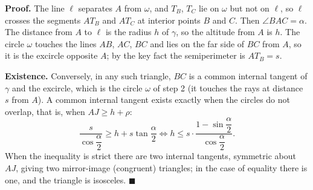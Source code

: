 \textbf{Proof.} The line $\ell$ separates $A$ from $\omega$, and $T_B$, $T_C$ lie on $\omega$ but not on $\ell$, so $\ell$ crosses the segments $AT_B$ and $AT_C$ at interior points $B$ and $C$. Then $\angle BAC=\alpha$. The distance from $A$ to $\ell$ is the radius $h$ of $\gamma$, so the altitude from $A$ is $h$. The circle $\omega$ touches the lines $AB$, $AC$, $BC$ and lies on the far side of $BC$ from $A$, so it is the excircle opposite $A$; by the key fact the semiperimeter is $AT_B=s$.

\textbf{Existence.} Conversely, in any such triangle, $BC$ is a common internal tangent of $\gamma$ and the excircle, which is the circle $\omega$ of step 2 (it touches the rays at distance $s$ from $A$). A common internal tangent exists exactly when the circles do not overlap, that is, when $AJ\ge h+\rho$:
\[\dfrac{s}{\cos\dfrac\alpha2}\ge h+s\tan\dfrac\alpha2\iff h\le s\cdot\dfrac{1-\sin\dfrac\alpha2}{\cos\dfrac\alpha2}.\]
When the inequality is strict there are two internal tangents, symmetric about $AJ$, giving two mirror-image (congruent) triangles; in the case of equality there is one, and the triangle is isosceles. $\blacksquare$
